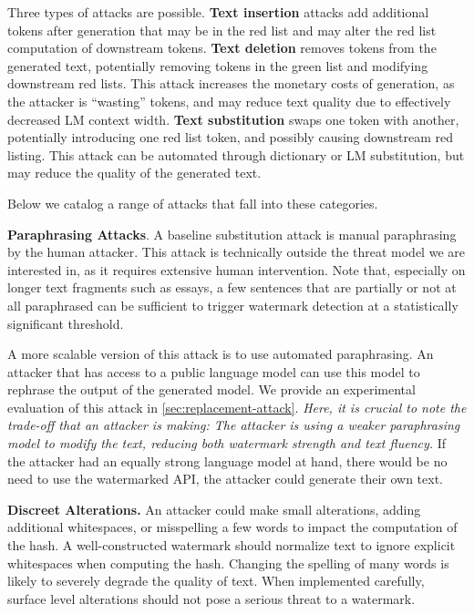 \documentclass{article}
\theoremstyle{plain}
\theoremstyle{definition}
\theoremstyle{remark}
\begin{document}
Three types of attacks are possible.
\textbf{Text insertion} attacks add additional tokens after generation that may be in the red list and may alter the red list computation of downstream tokens.
\textbf{Text deletion} removes tokens from the generated text, potentially removing tokens in the green list and modifying downstream red lists. 
This attack increases the monetary costs of generation, as the attacker is ``wasting'' tokens, and may reduce text quality due to effectively decreased LM context width.
\textbf{Text substitution} swaps one token with another, potentially introducing one red list token, and possibly causing downstream red listing. This attack can be automated through dictionary or LM substitution, but may reduce the quality of the generated text. 

Below we catalog a range of attacks that fall into these categories.

\textbf{Paraphrasing Attacks}.
A baseline substitution attack is manual paraphrasing by the human attacker. This attack is technically outside the threat model we are interested in, as it requires extensive human intervention. 
Note that, especially on longer text fragments such as essays, a few sentences that are partially or not at all paraphrased can be sufficient to trigger watermark detection at a statistically significant threshold.

A more scalable version of this attack is to use automated paraphrasing. An attacker that has access to a public language model can use this model to rephrase the output of the generated model. We provide an experimental evaluation of this attack in \cref{sec:replacement-attack}. \emph{Here, it is crucial to note the trade-off that an attacker is making: The attacker is using a weaker paraphrasing model to modify the text, reducing both watermark strength and text fluency.} If the attacker had an equally strong language model at hand, there would be no need to use the watermarked API, the attacker could generate their own text.


\textbf{Discreet Alterations.}
An attacker could make small alterations, adding additional whitespaces, or misspelling a few words to impact the computation of the hash.
A well-constructed watermark should normalize text to ignore explicit whitespaces when computing the hash. Changing the spelling of many words is likely to severely degrade the quality of text. When implemented carefully, surface level alterations should not pose a serious threat to a watermark. 
\end{document}
